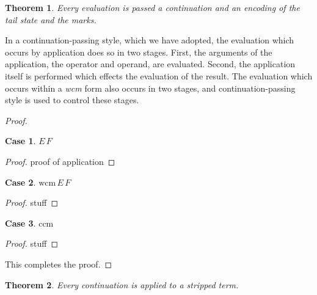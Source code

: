 \documentclass[ms,electronic,twosidetoc,letterpaper,chaptercenter,parttop]{byumsphd}
\begin{document}





\newtheorem{thm}{Theorem}
\newtheorem{case}{Case}
\begin{thm}
Every evaluation is passed a continuation and an encoding of the tail state and the marks.
\end{thm}
In a continuation-passing style, which we have adopted, the evaluation which occurs by application does so in two stages. First, the arguments of the application, the operator and operand, are evaluated. Second, the application itself is performed which effects the evaluation of the result.
The evaluation which occurs within a \emph{wcm} form also occurs in two stages, and continuation-passing style is used to control these stages.

\begin{proof}
\begin{case}
$E\,F$
\end{case}
\begin{proof}
proof of application
\end{proof}

\begin{case}
$\mathrm{wcm}\,E\,F$
\end{case}
\begin{proof}
stuff
\end{proof}

\begin{case}
$\mathrm{ccm}$
\end{case}
\begin{proof}
stuff
\end{proof}
This completes the proof.
\end{proof}

\begin{thm}
Every continuation is applied to a stripped term.
\end{thm}
\end{document}
